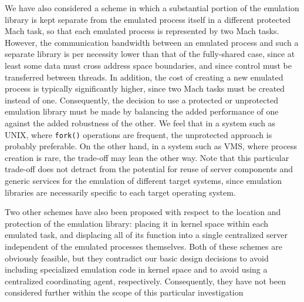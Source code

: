 
We have also considered a scheme in which a substantial portion of the
emulation library is kept separate from the emulated process itself in
a different protected Mach task, so that each emulated process is
represented by two Mach tasks.  However, the communication bandwidth
between an emulated process and such a separate library is per
necessity lower than that of the fully-shared case, since at least
some data must cross address space boundaries, and since control must
be transferred between threads.  In addition, the cost of creating a
new emulated process is typically significantly higher, since two Mach
tasks must be created instead of one.  Consequently, the decision to
use a protected or unprotected emulation library must be made by
balancing the added performance of one against the added robustness of
the other. We feel that in a system such as UNIX, where {\tt fork()}
operations are frequent, the unprotected approach is probably
preferable. On the other hand, in a system such as VMS, where process
creation is rare, the trade-off may lean the other way. Note that this
particular trade-off does not detract from the potential for reuse of
server components and generic services for the emulation of different
target systems, since emulation libraries are necessarily specific to
each target operating system.

Two other schemes have also been proposed with respect to the location
and protection of the emulation library: placing it in kernel space
within each emulated task, and displacing all of its function into a
single centralized server independent of the emulated processes
themselves. Both of these schemes are obviously feasible, but they
contradict our basic design decisions to avoid including specialized
emulation code in kernel space and to avoid using a centralized
coordinating agent, respectively. Consequently, they have not been
considered further within the scope of this particular investigation


